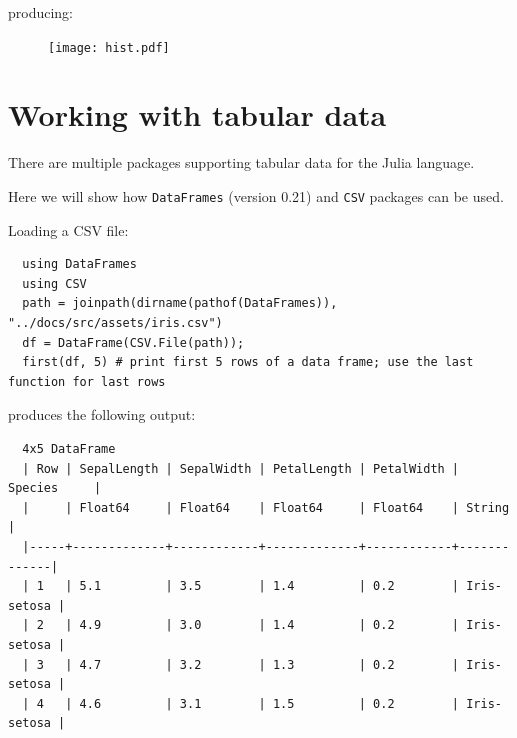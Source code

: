 \documentclass[10pt,a4paper]{article}
\begin{document}
producing:
\begin{figure}[h]
\centering
\texttt{[image: hist.pdf]}
\end{figure}

\section{Working with tabular data}

There are multiple packages supporting tabular data for the Julia language.

Here we will show how \lstinline|DataFrames| (version 0.21)
and \lstinline|CSV| packages can be used.

Loading a CSV file:
\begin{lstlisting}
  using DataFrames
  using CSV
  path = joinpath(dirname(pathof(DataFrames)), "../docs/src/assets/iris.csv")
  df = DataFrame(CSV.File(path));
  first(df, 5) # print first 5 rows of a data frame; use the last function for last rows
\end{lstlisting}

produces the following output:
\begin{lstlisting}
  4x5 DataFrame
  | Row | SepalLength | SepalWidth | PetalLength | PetalWidth | Species     |
  |     | Float64     | Float64    | Float64     | Float64    | String      |
  |-----+-------------+------------+-------------+------------+-------------|
  | 1   | 5.1         | 3.5        | 1.4         | 0.2        | Iris-setosa |
  | 2   | 4.9         | 3.0        | 1.4         | 0.2        | Iris-setosa |
  | 3   | 4.7         | 3.2        | 1.3         | 0.2        | Iris-setosa |
  | 4   | 4.6         | 3.1        | 1.5         | 0.2        | Iris-setosa |
\end{lstlisting}
\end{document}
